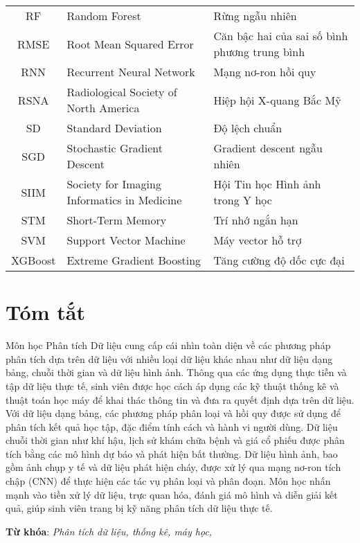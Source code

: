 \begin{table}[ht!]
\begin{tabular}{|c|p{5cm}|p{7cm}|}
RF & Random Forest & Rừng ngẫu nhiên \\
RMSE & Root Mean Squared Error & Căn bậc hai của sai số bình phương trung bình \\
RNN & Recurrent Neural Network & Mạng nơ-ron hồi quy \\
RSNA & Radiological Society of North America & Hiệp hội X-quang Bắc Mỹ \\
SD & Standard Deviation & Độ lệch chuẩn \\
SGD & Stochastic Gradient Descent & Gradient descent ngẫu nhiên \\
SIIM & Society for Imaging Informatics in Medicine & Hội Tin học Hình ảnh trong Y học \\
STM & Short-Term Memory & Trí nhớ ngắn hạn \\
SVM & Support Vector Machine & Máy vector hỗ trợ \\
XGBoost & Extreme Gradient Boosting & Tăng cường độ dốc cực đại \\
\hline
\end{tabular}
\end{table}



\chapter*{Tóm tắt}
Môn học Phân tích Dữ liệu cung cấp cái nhìn toàn diện về các phương pháp phân tích dựa trên dữ liệu với nhiều loại dữ liệu khác nhau như dữ liệu dạng bảng, chuỗi thời gian và dữ liệu hình ảnh. Thông qua các ứng dụng thực tiễn và tập dữ liệu thực tế, sinh viên được học cách áp dụng các kỹ thuật thống kê và thuật toán học máy để khai thác thông tin và đưa ra quyết định dựa trên dữ liệu. Với dữ liệu dạng bảng, các phương pháp phân loại và hồi quy được sử dụng để phân tích kết quả học tập, đặc điểm tính cách và hành vi người dùng. Dữ liệu chuỗi thời gian như khí hậu, lịch sử khám chữa bệnh và giá cổ phiếu được phân tích bằng các mô hình dự báo và phát hiện bất thường. Dữ liệu hình ảnh, bao gồm ảnh chụp y tế và dữ liệu phát hiện cháy, được xử lý qua mạng nơ-ron tích chập (CNN) để thực hiện các tác vụ phân loại và phân đoạn. Môn học nhấn mạnh vào tiền xử lý dữ liệu, trực quan hóa, đánh giá mô hình và diễn giải kết quả, giúp sinh viên trang bị kỹ năng phân tích dữ liệu thực tế.


\textbf{Từ khóa}: \textit{Phân tích dữ liệu, thống kê, máy học,}

